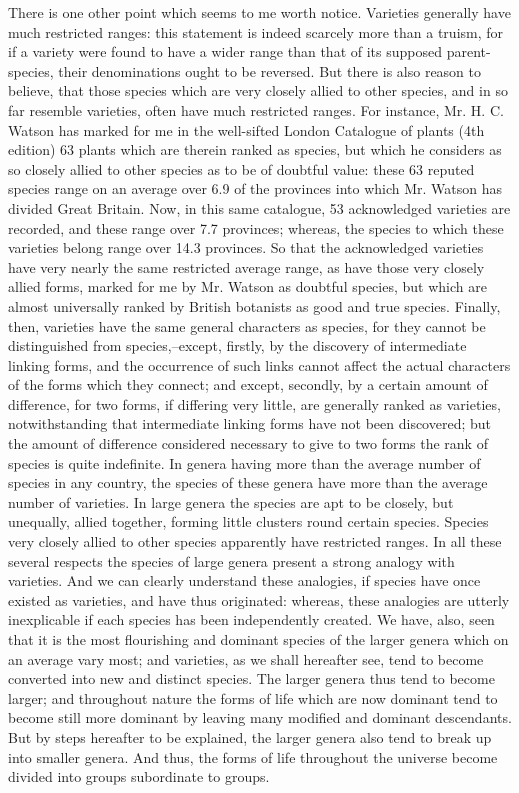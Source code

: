 There is one other point which seems to me worth notice. Varieties generally have much restricted ranges: this statement is indeed scarcely more than a truism, for if a variety were found to have a wider range than that of its supposed parent-species, their denominations ought to be reversed. But there is also reason to believe, that those species which are very closely allied to other species, and in so far resemble varieties, often have much restricted ranges. For instance, Mr. H. C. Watson has marked for me in the well-sifted London Catalogue of plants (4th edition) 63 plants which are therein ranked as species, but which he considers as so closely allied to other species as to be of doubtful value: these 63 reputed species range on an average over 6.9 of the provinces into which Mr. Watson has divided Great Britain. Now, in this same catalogue, 53 acknowledged varieties are recorded, and these range over 7.7 provinces; whereas, the species to which these varieties belong range over 14.3 provinces. So that the acknowledged varieties have very nearly the same restricted average range, as have those very closely allied forms, marked for me by Mr. Watson as doubtful species, but which are almost universally ranked by British botanists as good and true species.
Finally, then, varieties have the same general characters as species, for they cannot be distinguished from species,--except, firstly, by the discovery of intermediate linking forms, and the occurrence of such links cannot affect the actual characters of the forms which they connect; and except, secondly, by a certain amount of difference, for two forms, if differing very little, are generally ranked as varieties, notwithstanding that intermediate linking forms have not been discovered; but the amount of difference considered necessary to give to two forms the rank of species is quite indefinite. In genera having more than the average number of species in any country, the species of these genera have more than the average number of varieties. In large genera the species are apt to be closely, but unequally, allied together, forming little clusters round certain species. Species very closely allied to other species apparently have restricted ranges. In all these several respects the species of large genera present a strong analogy with varieties. And we can clearly understand these analogies, if species have once existed as varieties, and have thus originated: whereas, these analogies are utterly inexplicable if each species has been independently created.
We have, also, seen that it is the most flourishing and dominant species of the larger genera which on an average vary most; and varieties, as we shall hereafter see, tend to become converted into new and distinct species. The larger genera thus tend to become larger; and throughout nature the forms of life which are now dominant tend to become still more dominant by leaving many modified and dominant descendants. But by steps hereafter to be explained, the larger genera also tend to break up into smaller genera. And thus, the forms of life throughout the universe become divided into groups subordinate to groups. 